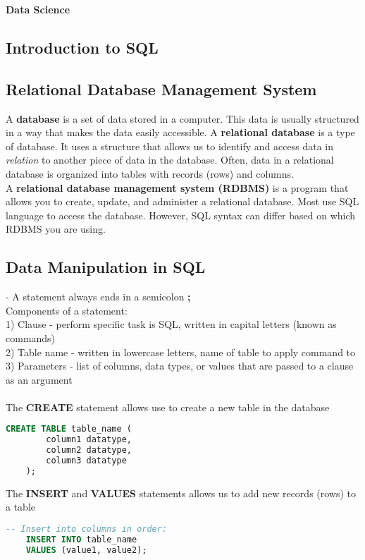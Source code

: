 \documentclass[11pt, a4paper]{article}
\begin{document}
	\begin{titlepage}
		\begin{center} \Huge \textbf{Data Science} \end{center}
		\tableofcontents
		\newpage
	\end{titlepage}
	\begin{spacing}{1.1}
	\section{Introduction to SQL}
	\subsection{Relational Database Management System}
	A \textbf{database} is a set of data stored in a computer. This data is usually structured in a way that makes the data easily accessible. A \textbf{relational database} is a type of database. It uses a structure that allows us to identify and access data in \textit{relation} to another piece of data in the database. Often, data in a relational database is organized into tables with records (rows) and columns. \vspace*{1mm}\\
	A \textbf{relational database management system (RDBMS)} is a program that allows you to create, update, and administer a relational database. Most use SQL language to access the database. However, SQL syntax can differ based on  which RDBMS you are using. \\
	
	\subsection{Data Manipulation in SQL}
	- A statement always ends in a semicolon \textbf{;} \vspace*{1mm}\\
	Components of a statement: \\
	1) Clause -  perform specific task is SQL, written in capital letters (known as commands) \\
	2) Table name - written in lowercase letters, name of table to apply command to \\
	3) Parameters - list of columns, data types, or values that are passed to a clause as an argument\\~\\
	The \textbf{CREATE} statement allows use to create a new table in the database 
	\begin{lstlisting}[language=SQL]
	CREATE TABLE table_name (
		column1 datatype,
		column2 datatype,
		column3 datatype
	);	\end{lstlisting} \vspace*{1mm}
	The \textbf{INSERT} and \textbf{VALUES} statements allows us to add new records (rows) to a table
	\begin{lstlisting}[language=SQL]
	-- Insert into columns in order:
	INSERT INTO table_name
	VALUES (value1, value2);
	

\end{lstlisting}
\end{spacing}
\end{document}
